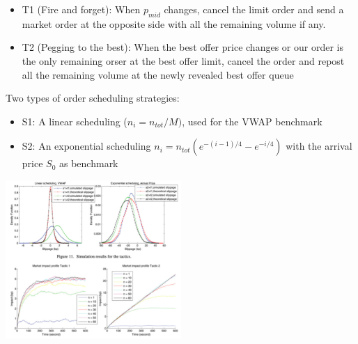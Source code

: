 \begin{itemize}
	\item T1 (Fire and forget): When $p_{mid}$ changes, cancel the limit order and send a market order at the opposite side with all the remaining volume if any.
	\item T2 (Pegging to the best): When the best offer price changes or our order is the only remaining orser at the best offer limit, cancel the order and repost all the remaining volume at the newly revealed best offer queue
\end{itemize}
Two types of order scheduling strategies:
\begin{itemize}
	\item S1: A linear scheduling ($n_i = n_{tot}/M)$, used for the VWAP benchmark
	\item S2: An exponential scheduling $n_i = n_{tot} (e^{-(i-1)/4} - e^{-i/4})$ with the arrival price $S_0$ as benchmark
\end{itemize}
\begin{center}
	\includegraphics[width=0.5\textwidth]{picture/(38)order_placement_analysis.png}
\end{center}

